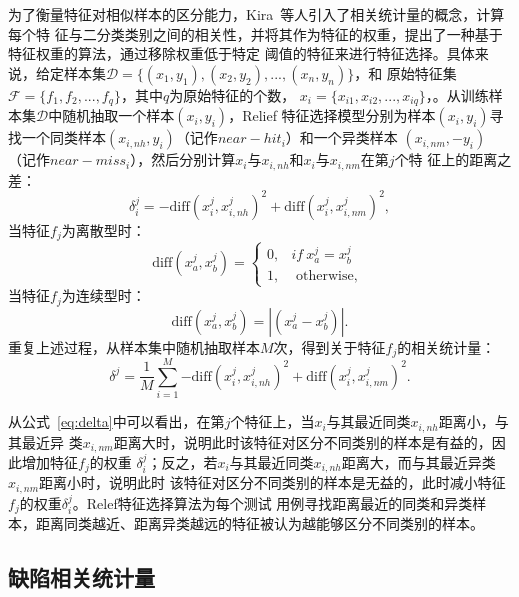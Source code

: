 为了衡量特征对相似样本的区分能力，Kira~\cite{kira1992feature}等人引入了相关统计量的概念，计算每个特
征与二分类类别之间的相关性，并将其作为特征的权重，提出了一种基于特征权重的算法，通过移除权重低于特定
阈值的特征来进行特征选择。具体来说，给定样本集$\mathcal D=\{(x_1,y_1),(x_2,y_2),...,(x_n,y_n)\}$，和
原始特征集$\mathcal F=\{f_1,f_2,...,f_q\}$，其中$q$为原始特征的个数，
$x_i=\{x_{i1},x_{i2},...,x_{iq}\}$，。从训练样本集$\mathcal D$中随机抽取一个样本$(x_i,y_i)$，Relief
特征选择模型分别为样本$(x_i,y_i)$寻找一个同类样本$(x_{i,nh},y_i)$（记作$near-hit_i$）和一个异类样本
$(x_{i,nm},-y_i)$（记作$near-miss_i$），然后分别计算$x_i$与$x_{i,nh}$和$x_i$与$x_{i,nm}$在第$j$个特
征上的距离之差：
\begin{equation}
       \delta^j_i = -\text{diff}(x_i^j, x_{i,nh}^j)^2 + \text{diff}(x_i^j,x_{i,nm}^j)^2, \label{eq:delta}
\end{equation}
当特征$f_j$为离散型时：
\begin{equation}\label{eq:lisan}
       \text{diff}(x^j_a,x^j_b) = \begin{cases} 0, & \textit{if}~x^j_a=x^j_b \\ 
  1, & \text{ otherwise, }  
  \end{cases} 
\end{equation}
当特征$f_j$为连续型时：
\begin{equation}
       \text{diff}(x^j_a,x^j_b) = |(x^j_a-x^j_b)|.
\end{equation}
重复上述过程，从样本集中随机抽取样本$M$次，得到关于特征$f_j$的相关统计量：
\begin{equation}
       \delta^j = \frac{1}{M}\sum_{i=1}^M{-\text{diff}(x_i^j, x_{i,nh}^j)^2 + \text{diff}(x_i^j,x_{i,nm}^j)^2}. \label{eq:Delta}
\end{equation}

从公式~\eqref{eq:delta}中可以看出，在第$j$个特征上，当$x_i$与其最近同类$x_{i,nh}$距离小，与其最近异
类$x_{i,nm}$距离大时，说明此时该特征对区分不同类别的样本是有益的，因此增加特征$f_j$的权重
$\delta^j_i$；反之，若$x_i$与其最近同类$x_{i,nh}$距离大，而与其最近异类$x_{i,nm}$距离小时，说明此时
该特征对区分不同类别的样本是无益的，此时减小特征$f_j$的权重$\delta^j_i$。Relef特征选择算法为每个测试
用例寻找距离最近的同类和异类样本，距离同类越近、距离异类越远的特征被认为越能够区分不同类别的样本。

\subsection{缺陷相关统计量}
